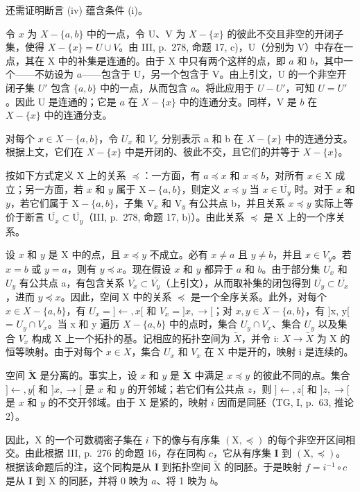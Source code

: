 还需证明断言 (iv) 蕴含条件 (i)。

令 \(x\) 为 \(X - \{a, b\}\) 中的一点，令 U、V 为 \(X - \{x\}\) 的彼此不交且非空的开闭子集，使得 \(X - \{x\} = U \cup V\)。由 III, p.~278, 命题 17, c)，U（分别为 V）中存在一点，其在 X 中的补集是连通的。由于 X 中只有两个这样的点，即 \(a\) 和 \(b\)，其中一个——不妨设为 \(a\)——包含于 U，另一个包含于 V。由上引文，U 的一个非空开闭子集 \(U'\) 包含 \(\{a, b\}\) 中的一点，从而包含 \(a\)。将此应用于 \(U - U'\)，可知 \(U = U'\)。因此 U 是连通的；它是 \(a\) 在 \(X - \{x\}\) 中的连通分支。同样，V 是 \(b\) 在 \(X - \{x\}\) 中的连通分支。

对每个 \(x \in X - \{a, b\}\)，令 \(U_x\) 和 \(V_x\) 分别表示 a 和 b 在 \(X - \{x\}\) 中的连通分支。根据上文，它们在 \(X - \{x\}\) 中是开闭的、彼此不交，且它们的并等于 \(X - \{x\}\)。

按如下方式定义 X 上的关系 \(\preccurlyeq\)：一方面，有 \(a \preccurlyeq x\) 和 \(x \preccurlyeq b\)，对所有 \(x \in \mathrm{X}\) 成立；另一方面，若 \(x\) 和 \(y\) 属于 \(\mathrm{X} - \{a, b\}\)，则定义 \(x \preccurlyeq y\) 当 \(x \in \overline{\mathrm{U}_y}\) 时。对于 \(x\) 和 \(y\)，若它们属于 \(\mathrm{X} - \{a, b\}\)，子集 \(\mathrm{V}_x\) 和 \(\mathrm{V}_y\) 有公共点 b，并且关系 \(x \preccurlyeq y\) 实际上等价于断言 \(\overline{\mathrm{U}_x} \subset \overline{\mathrm{U}_y}\)（III, p.~278, 命题 17, b)）。由此关系 \(\preccurlyeq\) 是 X 上的一个序关系。

设 \(x\) 和 \(y\) 是 X 中的点，且 \(x \preccurlyeq y\) 不成立。必有 \(x \neq a\) 且 \(y \neq b\)，并且 \(x \in V_y\)。若 \(x = b\) 或 \(y = a\)，则有 \(y \preccurlyeq x\)。现在假设 \(x\) 和 \(y\) 都异于 \(a\) 和 \(b\)。由于部分集 \(U_x\) 和 \(U_y\) 有公共点 a，有包含关系 \(\overline{V_x} \subset \overline{V_y}\)（上引文），从而取补集的闭包得到 \(\overline{U_y} \subset \overline{U_x}\)，进而 \(y \preccurlyeq x\)。因此，空间 X 中的关系 \(\preccurlyeq\) 是一个全序关系。此外，对每个 \(x \in X - \{a, b\}\)，有 \(U_x = ] \leftarrow, x[\) 和 \(V_x = ]x, \rightarrow[\)；对 \(x, y \in X - \{a, b\}\)，有 {]}x, y{[} = \(U_y \cap V_x\)。当 x 和 y 遍历 \(X - \{a, b\}\) 中的点时，集合 \(U_y \cap V_x\)、集合 \(U_y\) 以及集合 \(V_x\) 构成 X 上一个拓扑的基。记相应的拓扑空间为 \(\widetilde{X}\)，并令 i: \(X \to \widetilde{X}\) 为 X 的恒等映射。由于对每个 \(x \in X\)，集合 \(U_x\) 和 \(V_x\) 在 X 中是开的，映射 i 是连续的。

空间 \(\widetilde{\mathbf{X}}\) 是分离的。事实上，设 \(x\) 和 \(y\) 是 \(\widetilde{\mathbf{X}}\) 中满足 \(x \preccurlyeq y\) 的彼此不同的点。集合 \(]\leftarrow, y[\) 和 \(]x, \rightarrow[\) 是 \(x\) 和 \(y\) 的开邻域；若它们有公共点 \(z\)，则 \(]\leftarrow, z[\) 和 \(]z, \rightarrow[\) 是 \(x\) 和 \(y\) 的不交开邻域。由于 X 是紧的，映射 \(i\) 因而是同胚（TG, I, p.~63, 推论 2）。

因此，X 的一个可数稠密子集在 \(i\) 下的像与有序集 \((\mathrm{X}, \preccurlyeq)\) 的每个非空开区间相交。由此根据 III, p.~276 的命题 16，存在同构 \(c\)，它从有序集 \(\mathbf{I}\) 到 \((\mathrm{X}, \preccurlyeq)\)。根据该命题后的注，这个同构是从 \(\mathbf{I}\) 到拓扑空间 \(\widetilde{\mathrm{X}}\) 的同胚。于是映射 \(f = i^{-1} \circ c\) 是从 \(\mathbf{I}\) 到 X 的同胚，并将 0 映为 \(a\)、将 1 映为 \(b\)。

